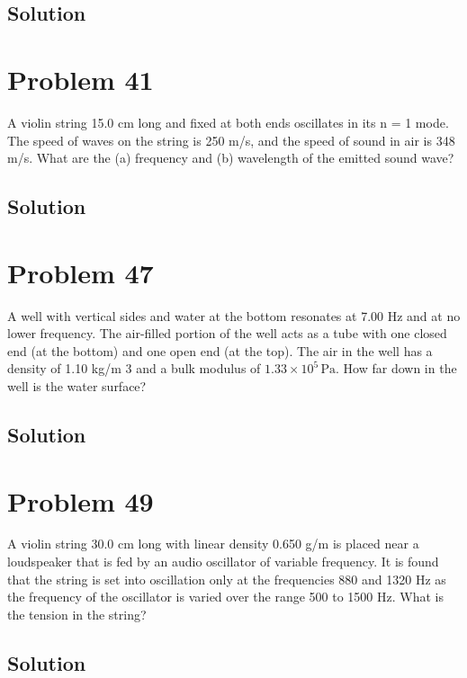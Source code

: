 \documentclass[12pt]{article}
\newcommand{\E}[1]{\times 10^{#1}}
\begin{document}
        \subsection{Solution}

    \pagebreak
    \section{Problem 41}
        A violin string 15.0 cm long and fixed at both ends oscillates in its n = 1 mode. 
        The speed of waves on the string is 250 m/s, and the speed of sound in air is 348 m/s. 
        What are the (a) frequency and (b) wavelength of the emitted sound wave?

        \subsection{Solution}

    \pagebreak
    \section{Problem 47}
        A well with vertical sides and water at the bottom resonates at 7.00 Hz and at no lower frequency. 
        The air-filled portion of the well acts as a tube with one closed end (at the bottom) and one open end (at the top). 
        The air in the well has a density of 1.10 kg/m 3 and a bulk modulus of $1.33\E{5}\,\unit{\pascal}$. 
        How far down in the well is the water surface?

        \subsection{Solution}

    \pagebreak
    \section{Problem 49}
        A violin string 30.0 cm long with linear density 0.650 g/m is placed near a loudspeaker that is fed by an audio oscillator of variable frequency. 
        It is found that the string is set into oscillation only at the frequencies 880 and 1320 Hz as the frequency of the oscillator is varied over the range 500 to 1500 Hz.
        What is the tension in the string?

        \subsection{Solution}
\end{document}
